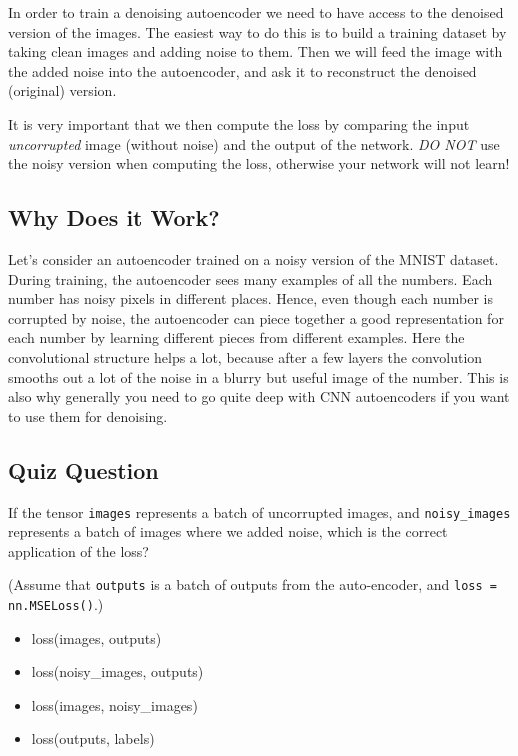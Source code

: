 In order to train a denoising autoencoder we need to have access to the denoised version of the images. The easiest way to do this is to build a training dataset by taking clean images and adding noise to them. Then we will feed the image with the added noise into the autoencoder, and ask it to reconstruct the denoised (original) version. \newline

It is very important that we then compute the loss by comparing the input \textit{uncorrupted} image (without noise) and the output of the network. \textit{DO NOT} use the noisy version when computing the loss, otherwise your network will not learn!

\subsection{Why Does it Work?}

Let's consider an autoencoder trained on a noisy version of the MNIST dataset. During training, the autoencoder sees many examples of all the numbers. Each number has noisy pixels in different places. Hence, even though each number is corrupted by noise, the autoencoder can piece together a good representation for each number by learning different pieces from different examples. Here the convolutional structure helps a lot, because after a few layers the convolution smooths out a lot of the noise in a blurry but useful image of the number. This is also why generally you need to go quite deep with CNN autoencoders if you want to use them for denoising.

\subsection{Quiz Question}

If the tensor \verb|images| represents a batch of uncorrupted images, and \verb|noisy_images| represents a batch of images where we added noise, which is the correct application of the loss?

(Assume that \verb|outputs| is a batch of outputs from the auto-encoder, and \verb|loss = nn.MSELoss()|.)
\begin{itemize}
    \item loss(images, outputs)
    \item loss(noisy\_images, outputs)
    \item loss(images, noisy\_images)
    \item loss(outputs, labels)
\end{itemize}

